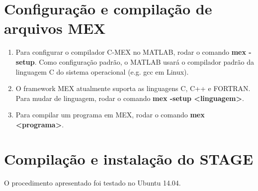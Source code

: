 \documentclass[
	12pt,				%
	openright,			%
	oneside,			%
	a4paper,			%
	english,			%
	french,				%
	spanish,			%
	brazil,				%
	]{abntex2}
\begin{document}
\begin{anexosenv}

\partanexos

\chapter{Configuração e compilação de arquivos MEX}
\begin{enumerate}
    \item Para configurar o compilador C-MEX no MATLAB, rodar o comando \textbf{mex -setup}. Como configuração padrão, o MATLAB usará o compilador padrão da linguagem C do sistema operacional (e.g. gcc em Linux).
    \item O framework MEX atualmente suporta as linguagens C, C++ e FORTRAN. Para mudar de linguagem, rodar o comando \textbf{mex -setup <linguagem>}.
    \item Para compilar um programa em MEX, rodar o comando \textbf{mex <programa>}.
\end{enumerate}

\chapter{Compilação e instalação do STAGE}

O procedimento apresentado foi testado no Ubuntu 14.04.


\end{anexosenv}
\end{document}
